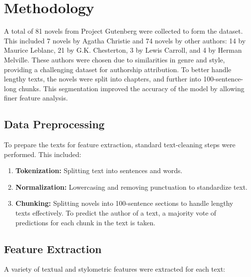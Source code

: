 \documentclass[journal]{IEEEtran} %
\begin{document}
\section{Methodology}
A total of 81 novels from Project Gutenberg were collected to form the dataset. This included 7 novels by Agatha Christie and 74 novels by other authors: 14 by Maurice Leblanc, 21 by G.K. Chesterton, 3 by Lewis Carroll, and 4 by Herman Melville. These authors were chosen due to similarities in genre and style, providing a challenging dataset for authorship attribution. To better handle lengthy texts, the novels were split into chapters, and further into 100-sentence-long chunks. This segmentation improved the accuracy of the model by allowing finer feature analysis.

\subsection{Data Preprocessing}  
To prepare the texts for feature extraction, standard text-cleaning steps were performed. This included:
\begin{enumerate}
    \item \textbf{Tokenization:} Splitting text into sentences and words.
    \item \textbf{Normalization:} Lowercasing and removing punctuation to standardize text.
    \item \textbf{Chunking:} Splitting novels into 100-sentence sections to handle lengthy texts effectively. To predict the author of a text, a majority vote of predictions for each chunk in the text is taken.
\end{enumerate}

\subsection{Feature Extraction}  
A variety of textual and stylometric features were extracted for each text:
\end{document}
